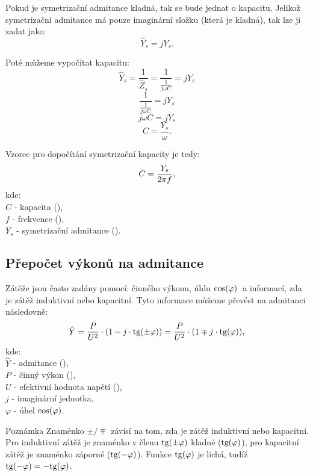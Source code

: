 \documentclass{article}
\begin{document}
Pokud je symetrizační admitance kladná, tak se bude jednat o kapacitu. Jelikož symetrizační admitance má pouze imaginární složku (která je kladná), tak lze ji zadat jako:
$$
    \hat{Y}_s = j Y_s.
$$

Poté můžeme vypočítat kapacitu:
$$
    \hat{Y}_s = \frac{1}{\hat{Z}_s} = \frac{1}{\frac{1}{j \omega C}} = j Y_s
$$
$$
    \frac{1}{\frac{1}{j \omega C}} = j Y_s
$$
$$
    j \omega C = j Y_s
$$
$$
    C = \frac{Y_s}{\omega}.
$$

Vzorec pro dopočítání symetrizační kapacity je tedy:
\begin{equation}
    C = \frac{Y_s}{2 \pi f},
    \unit{(\uFARAD)}
\end{equation}
kde:\\
$C$ - kapacita (\ueqFARAD),\\
$f$ - frekvence (\ueqHZ),\\
$Y_s$ - symetrizační admitance (\ueqS).\\



\subsection{Přepočet výkonů na admitance}
Zátěže jsou často zadány pomocí: činného výkonu, úhlu $\textrm{cos} (\varphi) \;$ a informací, zda je zátěž induktivní nebo kapacitní. Tyto informace můžeme převést na admitanci následovně:
\begin{equation}
    \hat{Y} = \frac{P}{U^2} \cdot (1 - j \cdot \te{tg} (\pm \varphi)) = \frac{P}{U^2} \cdot (1 \mp j \cdot \te{tg} (\varphi)),
    \unit{(S)}
\end{equation}
kde:\\
$\hat{Y}$ - admitance (\ueqS),\\
$P$ - činný výkon (\ueqW),\\
$U$ - efektivní hodnota napětí (\ueqV),\\
$j$ - imaginární jednotka,\\
$\varphi$ - úhel $\textrm{cos} (\varphi)$.

\begin{notebox}{Poznámka}
    Znaménko $\pm / \mp$ závisí na tom, zda je zátěž induktivní nebo kapacitní. Pro induktivní zátěž je znaménko v členu $\textrm{tg} (\pm \varphi)$ kladné ($\textrm{tg} (\varphi)$), pro kapacitní zátěž je znaménko záporné ($\textrm{tg} (-\varphi)$). Funkce $\textrm{tg} (\varphi)$ je lichá, tudíž $\textrm{tg} (-\varphi) = - \textrm{tg} (\varphi)$.
\end{notebox}
\end{document}
